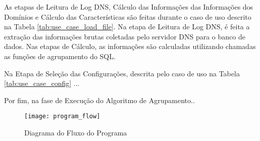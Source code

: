 As etapas de Leitura de Log DNS, Cálculo das Informações das Informações dos Domínios e Cálculo das Características são feitas durante o caso de uso descrito na Tabela \ref{tab:use_case_load_file}. Na etapa de Leitura de Log DNS, é feita a extração das informações brutas coletadas pelo servidor DNS para o banco de dados. Nas etapas de Cálculo, as informações são calculadas utilizando chamadas as funções de agrupamento do SQL.

Na Etapa de Seleção das Configurações, descrita pelo caso de uso na Tabela \ref{tab:use_case_config} ...

Por fim, na fase de Execução do Algoritmo de Agrupamento..


\begin{figure}
\centering
\texttt{[image: program\_flow]}
\caption[Diagram do Fluxo do Programa]{Diagrama do Fluxo do Programa} \label{fig:program_flow}
\end{figure}
